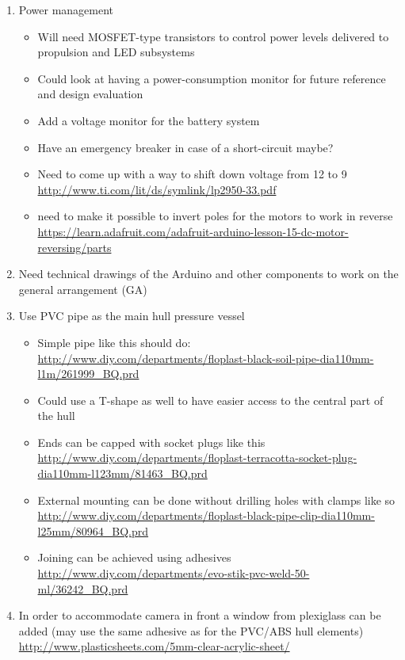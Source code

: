 \documentclass[11pt,a4paper,oneside]{report}
\begin{document}
\begin{enumerate}
\item Power management
	\begin{itemize}
	\item Will need MOSFET-type transistors to control power levels delivered to propulsion
		and LED subsystems
	\item Could look at having a power-consumption monitor for future reference and
		design evaluation
	\item Add a voltage monitor for the battery system
	\item Have an emergency breaker in case of a short-circuit maybe?
	\item Need to come up with a way to shift down voltage from 12 to 9
		\url{http://www.ti.com/lit/ds/symlink/lp2950-33.pdf}
	\item need to make it possible to invert poles for the motors to work in reverse
		\url{https://learn.adafruit.com/adafruit-arduino-lesson-15-dc-motor-reversing/parts}
	\end{itemize}

\item Need technical drawings of the Arduino and other components to work on the
	general arrangement (GA)
	
\item Use PVC pipe as the main hull pressure vessel
	\begin{itemize}
	\item Simple pipe like this should do: \\
		\url{http://www.diy.com/departments/floplast-black-soil-pipe-dia110mm-l1m/261999_BQ.prd}
	\item Could use a T-shape as well to have easier access to the central part of the hull
	\item Ends can be capped with socket plugs like this \\
		\url{http://www.diy.com/departments/floplast-terracotta-socket-plug-dia110mm-l123mm/81463_BQ.prd}
	\item External mounting can be done without drilling holes with clamps like so \\
		\url{http://www.diy.com/departments/floplast-black-pipe-clip-dia110mm-l25mm/80964_BQ.prd}
	\item Joining can be achieved using adhesives \\
		\url{http://www.diy.com/departments/evo-stik-pvc-weld-50-ml/36242_BQ.prd}
	\end{itemize}

\item In order to accommodate camera in front a window from plexiglass can be added (may use
	the same adhesive as for the PVC/ABS hull elements) \\
	\url{http://www.plasticsheets.com/5mm-clear-acrylic-sheet/}


\end{enumerate}
\end{document}
